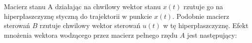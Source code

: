 \documentclass{article}
\begin{document}
		Macierz stanu A działając na chwilowy wektor stanu $x(t)$ rzutuje go na hiperpłaszczyznę
		styczną do trajektorii w punkcie $x(t)$. Podobnie macierz sterowań $B$ rzutuje chwilowy
		wektor sterowań $u(t)$ w tę hiperpłaszczyznę. Efekt mnożenia wektora wodzącego przez
		macierz pełnego rzędu $A$ jest następujący:
\end{document}
